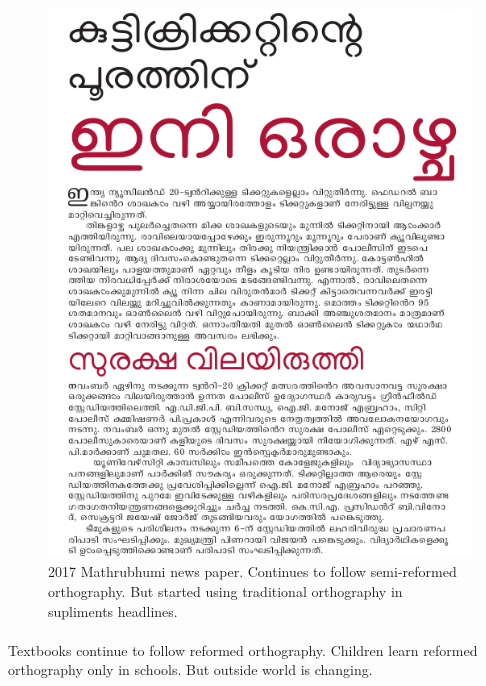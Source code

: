 \documentclass[10pt]{article}
\begin{document}
\begin{figure}[H]
	\centering
	\includegraphics[scale=0.5]{images/2017-Mathrubhumi-newspaper.png}
	\caption{2017 Mathrubhumi news paper. Continues to follow semi-reformed orthography. But started using traditional orthography in supliments headlines.}
\end{figure}

\paragraph{}
Textbooks continue to follow reformed orthography. Children learn reformed orthography only in schools. But outside world is changing. 
\end{document}
